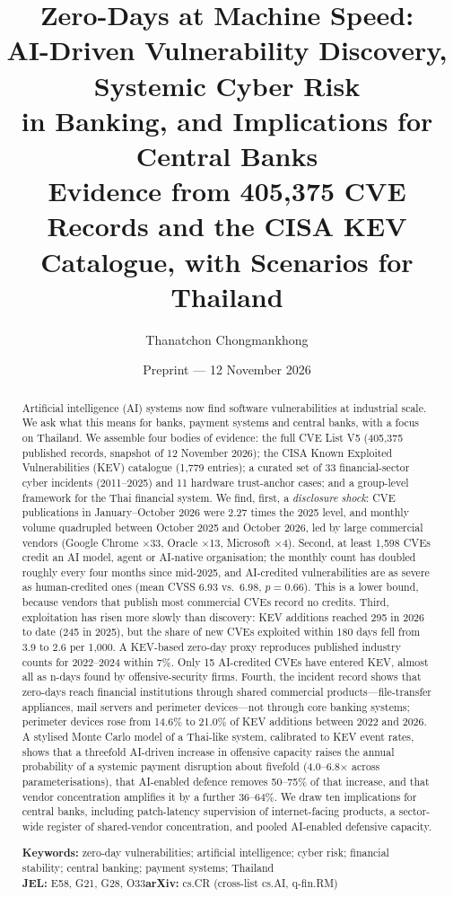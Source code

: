 \documentclass[11pt,a4paper]{article}
\title{\textbf{Zero-Days at Machine Speed:\\ AI-Driven Vulnerability Discovery, Systemic Cyber Risk\\ in Banking, and Implications for Central Banks}\\[4pt]
\large Evidence from 405,375 CVE Records and the CISA KEV Catalogue, with Scenarios for Thailand}
\author{Thanatchon Chongmankhong}
\date{Preprint --- 12 November 2026}
\begin{document}
\maketitle
\thispagestyle{empty}

\begin{abstract}
\noindent
Artificial intelligence (AI) systems now find software vulnerabilities at industrial scale. We ask what this means for banks, payment systems and central banks, with a focus on Thailand. We assemble four bodies of evidence: the full CVE List V5 (405,375 published records, snapshot of 12 November 2026); the CISA Known Exploited Vulnerabilities (KEV) catalogue (1,779 entries); a curated set of 33 financial-sector cyber incidents (2011--2025) and 11 hardware trust-anchor cases; and a group-level framework for the Thai financial system. We find, first, a \emph{disclosure shock}: CVE publications in January--October 2026 were 2.27 times the 2025 level, and monthly volume quadrupled between October 2025 and October 2026, led by large commercial vendors (Google Chrome $\times$33, Oracle $\times$13, Microsoft $\times$4). Second, at least 1,598 CVEs credit an AI model, agent or AI-native organisation; the monthly count has doubled roughly every four months since mid-2025, and AI-credited vulnerabilities are as severe as human-credited ones (mean CVSS 6.93 vs.\ 6.98, $p=0.66$). This is a lower bound, because vendors that publish most commercial CVEs record no credits. Third, exploitation has risen more slowly than discovery: KEV additions reached 295 in 2026 to date (245 in 2025), but the share of new CVEs exploited within 180 days fell from 3.9 to 2.6 per 1,000. A KEV-based zero-day proxy reproduces published industry counts for 2022--2024 within 7\%. Only 15 AI-credited CVEs have entered KEV, almost all as n-days found by offensive-security firms. Fourth, the incident record shows that zero-days reach financial institutions through shared commercial products---file-transfer appliances, mail servers and perimeter devices---not through core banking systems; perimeter devices rose from 14.6\% to 21.0\% of KEV additions between 2022 and 2026. A stylised Monte Carlo model of a Thai-like system, calibrated to KEV event rates, shows that a threefold AI-driven increase in offensive capacity raises the annual probability of a systemic payment disruption about fivefold (4.0--6.8$\times$ across parameterisations), that AI-enabled defence removes 50--75\% of that increase, and that vendor concentration amplifies it by a further 36--64\%. We draw ten implications for central banks, including patch-latency supervision of internet-facing products, a sector-wide register of shared-vendor concentration, and pooled AI-enabled defensive capacity.

\medskip
\noindent\textbf{Keywords:} zero-day vulnerabilities; artificial intelligence; cyber risk; financial stability; central banking; payment systems; Thailand\\
\noindent\textbf{JEL:} E58, G21, G28, O33\quad \textbf{arXiv:} cs.CR (cross-list cs.AI, q-fin.RM)
\end{abstract}
\end{document}
